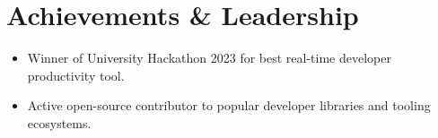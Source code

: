 \documentclass[10pt,a4paper]{article}
\begin{document}
\section*{Achievements \& Leadership}
\begin{itemize}
    \item Winner of University Hackathon 2023 for best real-time developer productivity tool.
    \item Active open-source contributor to popular developer libraries and tooling ecosystems.
\end{itemize}
\end{document}
